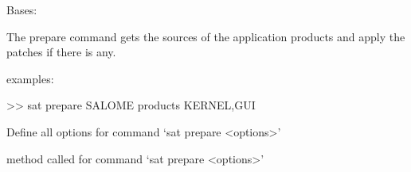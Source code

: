 \documentclass[a4paper,10pt,english]{sphinxmanual}
\begin{document}
\begin{fulllineitems}
\label{\detokenize{apidoc_commands/commands:commands.prepare.Command}}
Bases: 

The prepare command gets the sources of the application products 
and apply the patches if there is any.

\begin{DUlineblock}{0em}
\item[] examples:
\item[] \textgreater{}\textgreater{} sat prepare SALOME \textendash{}products KERNEL,GUI
\end{DUlineblock}

\begin{fulllineitems}
\label{\detokenize{apidoc_commands/commands:commands.prepare.Command.getParser}}
Define all options for command ‘sat prepare \textless{}options\textgreater{}’

\end{fulllineitems}


\begin{fulllineitems}
\label{\detokenize{apidoc_commands/commands:commands.prepare.Command.name}}
\end{fulllineitems}


\begin{fulllineitems}
\label{\detokenize{apidoc_commands/commands:commands.prepare.Command.run}}
method called for command ‘sat prepare \textless{}options\textgreater{}’

\end{fulllineitems}


\end{fulllineitems}

\end{document}
